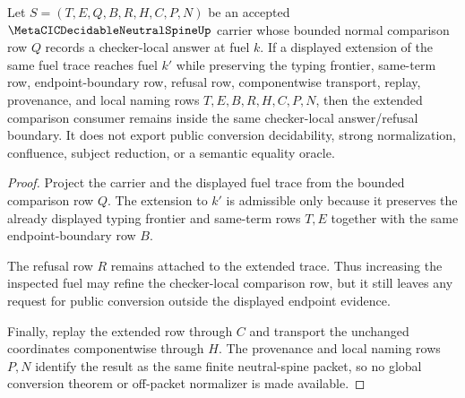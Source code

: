 \begin{theorem}
\label{thm:metacic-decidable-neutral-spine-fuel-monotonicity}
Let $S=(T,E,Q,B,R,H,C,P,N)$ be an accepted $\MetaCICDecidableNeutralSpineUp$ carrier whose bounded normal comparison row $Q$ records a checker-local answer at fuel $k$. If a displayed extension of the same fuel trace reaches fuel $k'$ while preserving the typing frontier, same-term row, endpoint-boundary row, refusal row, componentwise transport, replay, provenance, and local naming rows $T,E,B,R,H,C,P,N$, then the extended comparison consumer remains inside the same checker-local answer/refusal boundary. It does not export public conversion decidability, strong normalization, confluence, subject reduction, or a semantic equality oracle.
\end{theorem}
\begin{proof}
Project the carrier and the displayed fuel trace from the bounded comparison row $Q$. The extension to $k'$ is admissible only because it preserves the already displayed typing frontier and same-term rows $T,E$ together with the same endpoint-boundary row $B$.

The refusal row $R$ remains attached to the extended trace. Thus increasing the inspected fuel may refine the checker-local comparison row, but it still leaves any request for public conversion outside the displayed endpoint evidence.

Finally, replay the extended row through $C$ and transport the unchanged coordinates componentwise through $H$. The provenance and local naming rows $P,N$ identify the result as the same finite neutral-spine packet, so no global conversion theorem or off-packet normalizer is made available.
\end{proof}



